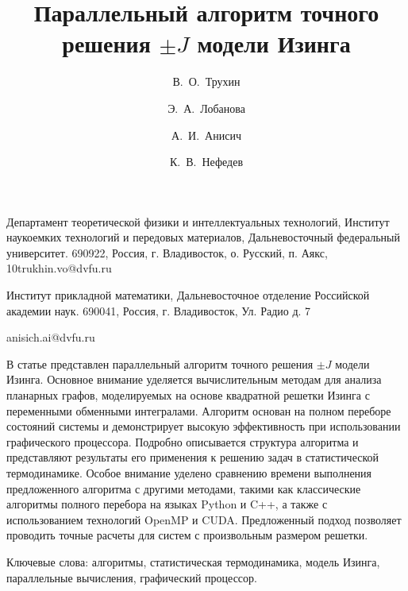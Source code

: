 \documentclass[10pt]{article}
\begin{document}
	
	
	
	\title{Параллельный алгоритм точного решения $\pm J$ модели Изинга}
	
	\author[1,2]{В.\, О.~Трухин}{Департамент теоретической физики и интеллектуальных технологий, Институт наукоемких технологий и передовых материалов, Дальневосточный федеральный университет. 690922, Россия, г. Владивосток, о. Русский, п. Аякс, 10}{trukhin.vo@dvfu.ru}
	\author[1,2]{Э.\, А.~Лобанова}{Институт прикладной математики, Дальневосточное отделение Российской академии наук. 690041, Россия, г. Владивосток, Ул. Радио д. 7}{}
	\author[1]{А.\, И.~Анисич}{}{anisich.ai@dvfu.ru}
	\author[1,2]{К.\, В.~Нефедев}{}{}
	
	
	
	
	\makeface
	
	
	
	\abstract В статье представлен параллельный алгоритм точного решения \(\pm J\) модели Изинга. Основное внимание уделяется вычислительным методам для анализа планарных графов, моделируемых на основе квадратной решетки Изинга с переменными обменными интегралами. Алгоритм основан на полном переборе состояний системы и демонстрирует высокую эффективность при использовании графического процессора. Подробно описывается структура алгоритма и представляют результаты его применения к решению задач в статистической термодинамике. Особое внимание уделено сравнению времени выполнения предложенного алгоритма с другими методами, такими как классические алгоритмы полного перебора на языках Python и C++, а также с использованием технологий OpenMP и CUDA. Предложенный подход позволяет проводить точные расчеты для систем с произвольным размером решетки.
	
	Ключевые слова: алгоритмы, статистическая термодинамика, модель Изинга, параллельные вычисления, графический процессор.
	
	
\end{document}
